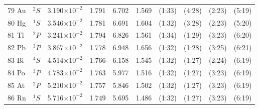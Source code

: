 \documentclass[12pt]{report}
\begin{document}
\begin{longtable}{l l r r r r r r r r}
79 Au & $^{2}S$ & 3.190$\times10^{-2}$ & 1.791 & 6.702 & 1.569 & (1:33) & (4:28) & (2:23) & (5:19) \\
80 Hg & $^{1}S$ & 3.546$\times10^{-2}$ & 1.781 & 6.691 & 1.604 & (1:32) & (3:28) & (2:23) & (5:20) \\
81 Tl & $^{2}P$ & 3.241$\times10^{-2}$ & 1.794 & 6.826 & 1.561 & (1:34) & (1:29) & (3:23) & (6:20) \\
82 Pb & $^{3}P$ & 3.867$\times10^{-2}$ & 1.778 & 6.948 & 1.656 & (1:32) & (1:28) & (3:25) & (6:21) \\
83 Bi & $^{4}S$ & 4.514$\times10^{-2}$ & 1.766 & 6.158 & 1.545 & (1:32) & (1:27) & (2:24) & (6:19) \\
84 Po & $^{3}P$ & 4.783$\times10^{-2}$ & 1.763 & 5.977 & 1.516 & (1:32) & (1:27) & (3:23) & (6:19) \\
85 At & $^{2}P$ & 5.210$\times10^{-2}$ & 1.757 & 5.846 & 1.502 & (1:32) & (1:27) & (3:23) & (6:19) \\
86 Rn & $^{1}S$ & 5.716$\times10^{-2}$ & 1.749 & 5.695 & 1.486 & (1:32) & (1:27) & (3:23) & (6:19) \\
\bottomrule
\end{longtable}
\end{document}
